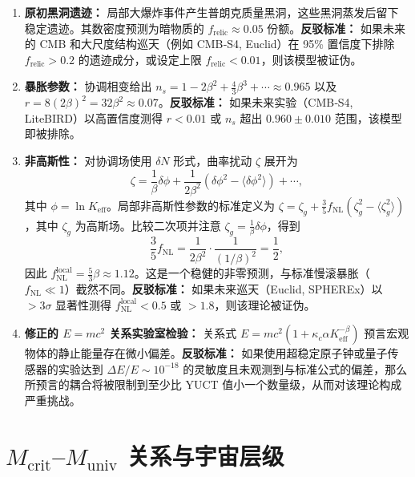 \documentclass[11pt,a4paper]{article}
\newcommand{\Keff}{K_{\mathrm{eff}}}
\begin{document}
	\begin{enumerate}
		\item \textbf{原初黑洞遗迹：} 局部大爆炸事件产生普朗克质量黑洞，这些黑洞蒸发后留下稳定遗迹。其数密度预测为暗物质的 \(f_{\mathrm{relic}} \approx 0.05\) 份额。\textbf{反驳标准：} 如果未来的 CMB 和大尺度结构巡天（例如 CMB‑S4, Euclid）在 95\% 置信度下排除 \(f_{\mathrm{relic}} > 0.2\) 的遗迹成分，或设定上限 \(f_{\mathrm{relic}} < 0.01\)，则该模型被证伪。
		\item \textbf{暴胀参数：} 协调相变给出 \(n_s = 1 - 2\beta^2 + \frac{4}{3}\beta^3 + \cdots \approx 0.965\) 以及 \(r = 8(2\beta)^2 = 32\beta^2 \approx 0.07\)。\textbf{反驳标准：} 如果未来实验（CMB‑S4, LiteBIRD）以高置信度测得 \(r < 0.01\) 或 \(n_s\) 超出 \(0.960 \pm 0.010\) 范围，该模型即被排除。
		\item \textbf{非高斯性：} 对协调场使用 \(\delta N\) 形式，曲率扰动 \(\zeta\) 展开为
		\[
		\zeta = \frac{1}{\beta} \delta\phi + \frac{1}{2\beta^2} (\delta\phi^2 - \langle\delta\phi^2\rangle) + \cdots,
		\]
		其中 \(\phi = \ln \Keff\)。局部非高斯性参数的标准定义为 \(\zeta = \zeta_g + \frac{3}{5} f_{\mathrm{NL}} (\zeta_g^2 - \langle\zeta_g^2\rangle)\)，其中 \(\zeta_g\) 为高斯场。比较二次项并注意 \(\zeta_g = \frac{1}{\beta}\delta\phi\)，得到
		\[
		\frac{3}{5} f_{\mathrm{NL}} = \frac{1}{2\beta^2} \cdot \frac{1}{(1/\beta)^2} = \frac{1}{2},
		\]
		因此 \(f_{\mathrm{NL}}^{\mathrm{local}} = \frac{5}{3}\beta \approx 1.12\)。这是一个稳健的非零预测，与标准慢滚暴胀（\(f_{\mathrm{NL}} \ll 1\)）截然不同。\textbf{反驳标准：} 如果未来巡天（Euclid, SPHEREx）以 \(>3\sigma\) 显著性测得 \(f_{\mathrm{NL}}^{\mathrm{local}} < 0.5\) 或 \(> 1.8\)，则该理论被证伪。
		\item \textbf{修正的 \(E=mc^2\) 关系实验室检验：} 关系式 \(E = m c^2 (1 + \kappa_c \alpha K_{\mathrm{eff}}^{-\beta})\) 预言宏观物体的静止能量存在微小偏差。\textbf{反驳标准：} 如果使用超稳定原子钟或量子传感器的实验达到 \(\Delta E / E \sim 10^{-18}\) 的灵敏度且未观测到与标准公式的偏差，那么所预言的耦合将被限制到至少比 YUCT 值小一个数量级，从而对该理论构成严重挑战。
	\end{enumerate}
	
	\part{\(M_{\mathrm{crit}}\)–\(M_{\mathrm{univ}}\) 关系与宇宙层级}
	\label{part:II}
	
\end{document}
